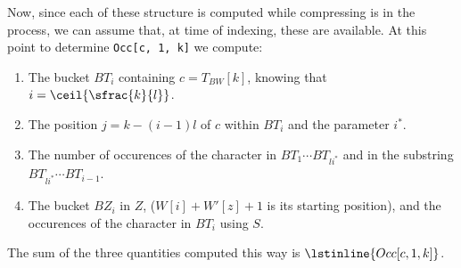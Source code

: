 \documentclass{subfiles}
\begin{document}
        Now, since each of these structure is computed while compressing is in the process, 
            we can assume that, at time of indexing, these are available.
            At this point to determine \lstinline{Occ[c, 1, k]} we compute:
            \begin{enumerate}
                \item The bucket \(BT_{i}\) containing \(c = T_{BW}[k]\), knowing that \(i = \ceil{\sfrac{k}{l}}\).
                \item The position \(j = k - (i - 1)l\) of \(c\) within \(BT_{i}\) and the parameter \(i^{*}\).
                \item The number of occurences of the character in \(BT_{1} \cdots BT_{li^{*}}\) and
                    in the substring \(BT_{li^{*}} \cdots BT_{i - 1}\).
                \item The bucket \(BZ_{i}\) in \(Z\), (\(W[i] + W'[z] + 1\) is its starting position),
                    and the occurences of the character in \(BT_{i}\) using \(S\).
            \end{enumerate}
            The sum of the three quantities computed this way is \(\lstinline{Occ[c, 1, k]}\).

\end{document}
